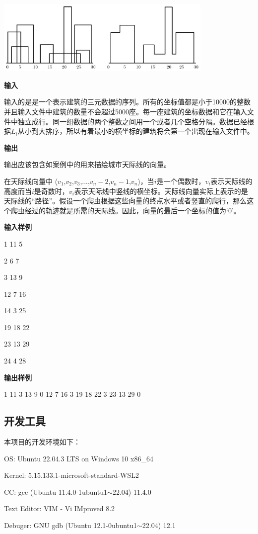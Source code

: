 \documentclass[a4paper]{ctexart}
\begin{document}
	\includegraphics[width=10.465cm,height=3.577cm]{effect.jpg}

	\textbf{输入}
	
	输入的是是一个表示建筑的三元数据的序列。所有的坐标值都是小于10000的整数并且输入文件中建筑的数量不会超过5000座。每一座建筑的坐标数据和它在输入文件中独立成行。同一组数据的两个整数之间用一个或者几个空格分隔。数据已经根据$L_i$从小到大排序，所以有着最小的横坐标的建筑将会第一个出现在输入文件中。

	\textbf{输出}

	输出应该包含如案例中的用来描绘城市天际线的向量。

	在天际线向量中 ($v_1$,$v_2$,$v_3$,...,$v_n-2$,$v_n-1$,$v_n$)，当$i$是一个偶数时，$v_i$表示天际线的高度而当$i$是奇数时，$v_i$表示天际线中竖线的横坐标。天际线向量实际上表示的是天际线的“路径”。假设一个爬虫根据这些向量的终点水平或者竖直的爬行，那么这个爬虫经过的轨迹就是所需的天际线。因此，向量的最后一个坐标的值为‘0’。

	\textbf{输入样例}

	1 11 5

	2 6 7

	3 13 9

	12 7 16

	14 3 25

	19 18 22

	23 13 29

	24 4 28

	\textbf{输出样例}

	1 11 3 13 9 0 12 7 16 3 19 18 22 3 23 13 29 0


	\subsection{开发工具}
	本项目的开发环境如下：

	OS: Ubuntu 22.04.3 LTS on Windows 10 x86\_64

	Kernel: 5.15.133.1-microsoft-standard-WSL2

	CC: gcc (Ubuntu 11.4.0-1ubuntu1$\sim$22.04) 11.4.0

	Text Editor: VIM - Vi IMproved 8.2

	Debuger: GNU gdb (Ubuntu 12.1-0ubuntu1$\sim$22.04) 12.1
\end{document}
